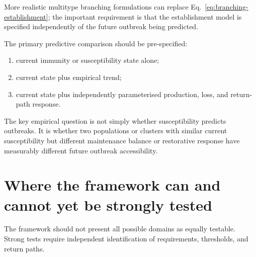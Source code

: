 \documentclass[11pt,a4paper]{article}
\begin{document}
More realistic multitype branching formulations can replace Eq.~\eqref{eq:branching-establishment}; the important requirement is that the establishment model is specified independently of the future outbreak being predicted.

The primary predictive comparison should be pre-specified:
\begin{enumerate}[nosep]
    \item current immunity or susceptibility state alone;
    \item current state plus empirical trend;
    \item current state plus independently parameterised production, loss, and return-path response.
\end{enumerate}

The key empirical question is not simply whether susceptibility predicts outbreaks. It is whether two populations or clusters with similar current susceptibility but different maintenance balance or restorative response have measurably different future outbreak accessibility.

\section{Where the framework can and cannot yet be strongly tested}

The framework should not present all possible domains as equally testable. Strong tests require independent identification of requirements, thresholds, and return paths.
\end{document}
